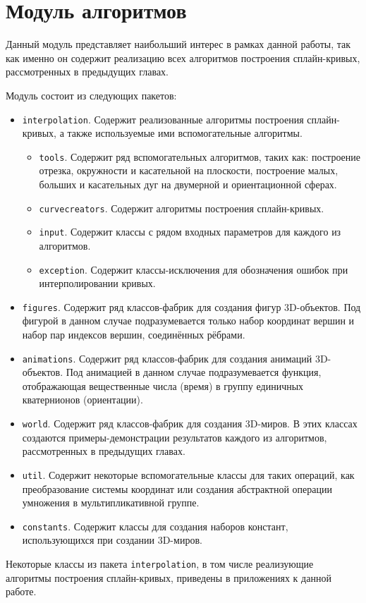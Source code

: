 \section{Модуль алгоритмов}

Данный модуль представляет наибольший интерес в рамках данной работы, так как именно он содержит реализацию всех
алгоритмов построения сплайн-кривых, рассмотренных в предыдущих главах.

Модуль состоит из следующих пакетов:

\begin{itemize}

\item \texttt{interpolation}. Содержит реализованные алгоритмы построения сплайн-кри\-вых, а также используемые ими
вспомогательные алгоритмы.
    \begin{itemize}
    \item \texttt{tools}. Содержит ряд вспомогательных алгоритмов, таких как: построение отрезка, окружности и
    касательной на плоскости, построение малых, больших и касательных дуг на двумерной и ориентационной сферах.
    \item \texttt{curvecreators}. Содержит алгоритмы построения сплайн-кривых.
    \item \texttt{input}. Содержит классы с рядом входных параметров для каждого из алгоритмов.
    \item \texttt{exception}. Содержит классы-исключения для обозначения ошибок при интерполировании кривых.
    \end{itemize}

\item \texttt{figures}. Содержит ряд классов-фабрик для создания фигур 3D-объектов. Под фигурой в данном случае
подразумевается только набор координат вершин и набор пар индексов вершин, соединённых рёбрами.

\item \texttt{animations}. Содержит ряд классов-фабрик для создания анимаций 3D-объек\-тов. Под анимацией в данном
случае подразумевается функция, отображающая вещественные числа (время) в группу единичных кватернионов (ориентации).

\item \texttt{world}. Содержит ряд классов-фабрик для создания 3D-миров. В этих классах создаются примеры-демонстрации
результатов каждого из алгоритмов, рассмотренных в предыдущих главах.

\item \texttt{util}. Содержит некоторые вспомогательные классы для таких операций, как преобразование системы
координат или создания абстрактной операции умножения в мультипликативной группе.

\item \texttt{constants}. Содержит классы для создания наборов констант, использующихся при создании 3D-миров.

\end{itemize}

Некоторые классы из пакета \texttt{interpolation}, в том числе реализующие алгоритмы построения сплайн-кривых,
приведены в приложениях к данной работе.
